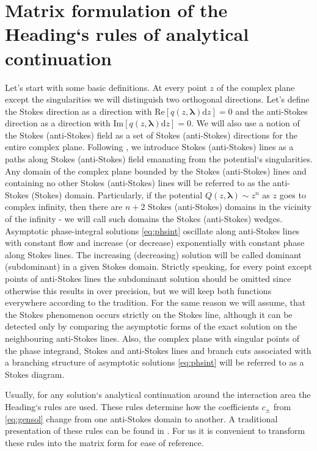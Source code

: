 \documentclass[atmp]{ipart_v1}
\def\rmd{\mathrm{d}}
\def\lmbd{\bm{\lambda}}
\def\Re{\mathrm{Re}}
\def\Im{\mathrm{Im}}
\newcommand\eref[1]{\eqref{#1}}
\newcommand\phsintgrnd[1][z]{q(#1,\lmbd)}
\begin{document}
\section{Matrix formulation of the Heading`s rules of analytical continuation \label{sec:mtrxfrm}}
Let's start with some basic definitions. At every point $z$ of the complex plane except the 
singularities we will distinguish two orthogonal directions. Let's define the Stokes direction 
as a direction with $\Re \left[ \phsintgrnd \rmd z \right]=0$ and the anti-Stokes direction 
as a direction with $\Im \left[ \phsintgrnd \rmd z \right]=0$. We will also use a notion of 
the Stokes (anti-Stokes) field as a set of Stokes (anti-Stokes) directions for the entire 
complex plane. Following \cite{heading, white}, we introduce Stokes (anti-Stokes) lines as a 
paths along Stokes (anti-Stokes) field emanating from the potential`s singularities. 
Any domain of the complex plane bounded by the Stokes (anti-Stokes) lines and containing no other 
Stokes (anti-Stokes) lines will be referred to as the anti-Stokes (Stokes) domain. Particularly, if 
the potential $Q(z,\lmbd) \sim z^n$ as $z$ goes to complex infinity, then there are $n+2$ Stokes 
(anti-Stokes) domains in the vicinity of the infinity - we will call such domains the Stokes 
(anti-Stokes) wedges. Asymptotic phase-integral solutions \eref{eq:phsint} oscillate along anti-Stokes 
lines with constant flow and increase (or decrease) exponentially with constant phase along Stokes lines. 
The increasing (decreasing) solution will be called dominant (subdominant) in a given Stokes domain. 
Strictly speaking, for every point except points of anti-Stokes lines the subdominant solution 
should be omitted since otherwise this results in over precision, but we will keep both functions 
everywhere according to the tradition. For the same reason we will assume, that the Stokes phenomenon 
occurs strictly on the Stokes line, although it can be detected only by comparing the asymptotic forms 
of the exact solution on the neighbouring anti-Stokes lines. Also, the complex plane with singular points
of the phase integrand, Stokes and anti-Stokes lines and branch cuts associated with a 
branching structure of asymptotic solutions \eref{eq:phsint} will be referred to as a Stokes diagram.

Usually, for any solution`s analytical continuation around the interaction area 
the Heading`s rules are used. These rules determine how the coefficients $c_\pm$ 
from \eref{eq:gensol} change from one anti-Stokes domain to another. A traditional presentation 
of these rules can be found in \cite{heading, white}. For us it is convenient to transform 
these rules into the matrix form for ease of reference.
\end{document}
